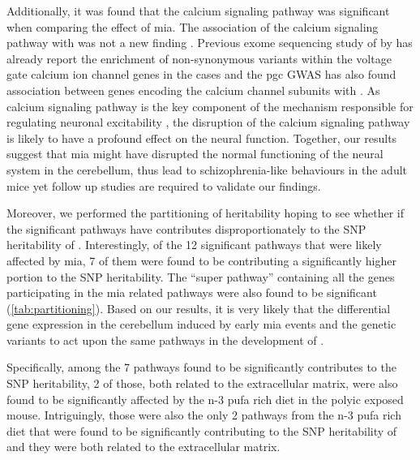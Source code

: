 Additionally, it was found that the calcium signaling pathway was significant when comparing the effect of \gls{mia}. 
The association of the calcium signaling pathway with  was not a new finding \citep{Lidow2003,Purcell2014,Ripke2014}.
Previous exome sequencing study of  by \citet{Purcell2014} has already report the enrichment of non-synonymous variants within the voltage gate calcium ion channel genes in the  cases and the \gls{pgc}  \gls{GWAS} has also found association between genes encoding the calcium channel subunits with .
As calcium signaling pathway is the key component of the mechanism responsible for regulating neuronal excitability \citep{Berridge2014}, the disruption of the calcium signaling pathway is likely to have a profound effect on the neural function. 
Together, our results suggest that \gls{mia} might have disrupted the normal functioning of the neural system in the cerebellum, thus lead to schizophrenia-like behaviours in the adult mice yet follow up studies are required to validate our findings.

Moreover, we performed the partitioning of heritability hoping to see whether if the significant pathways have contributes disproportionately to the \gls{SNP} heritability of .
Interestingly, of the 12 significant pathways that were likely affected by \gls{mia}, 7 of them were found to be contributing a significantly higher portion to the \gls{SNP} heritability.
The ``super pathway'' containing all the genes participating in the \gls{mia} related pathways were also found to be significant (\cref{tab:partitioning}).
Based on our results, it is very likely that the differential gene expression in the cerebellum induced by early \gls{mia} events and the genetic variants to act upon the same pathways in the development of .

Specifically, among the 7 pathways found to be significantly contributes to the \gls{SNP} heritability, 2 of those, both related to the extracellular matrix, were also found to be significantly affected by the n-3 \gls{pufa} rich diet in the \gls{polyic} exposed mouse. 
Intriguingly, those were also the only 2 pathways from the n-3 \gls{pufa} rich diet that were found to be significantly contributing to the \gls{SNP} heritability of  and they were both related to the extracellular matrix. 

